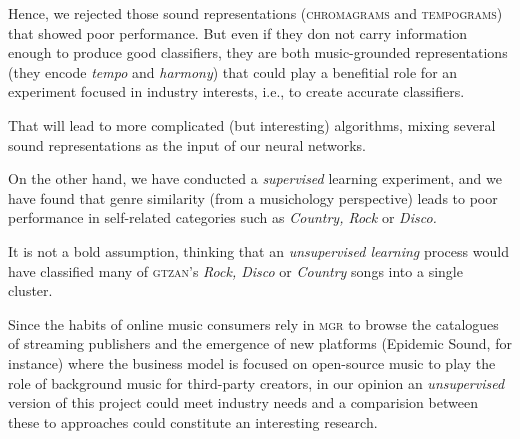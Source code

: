 Hence, we rejected those sound representations (\textsc{chromagrams} and \textsc{tempograms}) that showed poor performance. But even if they don not carry information enough to produce good classifiers, they are both music-grounded representations (they encode {\it tempo} and {\it harmony}) that could play a benefitial role for an experiment focused in industry interests, i.e., to create accurate classifiers.

That will lead to more complicated (but interesting) algorithms, mixing several sound representations as the input of our neural networks.

On the other hand, we have conducted a {\it supervised} learning experiment, and we have found that genre similarity (from a musichology perspective) leads to poor performance in self-related categories such as {\it Country, Rock} or {\it Disco.}

It is not a bold assumption, thinking that an {\it unsupervised learning} process would have classified many of \textsc{gtzan}'s {\it Rock, Disco} or {\it Country} songs into a single cluster.

Since the habits of online music consumers rely in \textsc{\textsc{\textsc{mgr}}} to browse the catalogues of streaming publishers and the emergence of new platforms (Epidemic Sound, for instance) where the business model is focused on open-source music to play the role of background music for third-party creators, in our opinion an {\it unsupervised} version of this project could meet industry needs and a comparision between these to approaches could constitute an interesting research.
